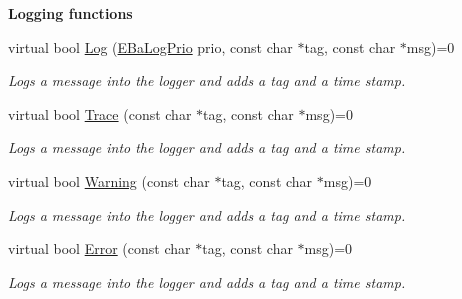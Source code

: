 \begin{Indent}\textbf{ Logging functions}\par
\begin{DoxyCompactItemize}
\item 
virtual bool \hyperlink{classIBaLog_aa5af90c31d02caaf2ce598eb71f774ad}{Log} (\hyperlink{BaLog_8h_ab14f00a81932b8b62d2e8c4a2d7e3916}{E\+Ba\+Log\+Prio} prio, const char $\ast$tag, const char $\ast$msg)=0
\begin{DoxyCompactList}\small\item\em Logs a message into the logger and adds a {\ttfamily tag} and a time stamp. \end{DoxyCompactList}\item 
virtual bool \hyperlink{classIBaLog_a3daf158cda6813367b7324ef5171291b}{Trace} (const char $\ast$tag, const char $\ast$msg)=0
\begin{DoxyCompactList}\small\item\em Logs a message into the logger and adds a {\ttfamily tag} and a time stamp. \end{DoxyCompactList}\item 
virtual bool \hyperlink{classIBaLog_a47861c723ea82ba833d71a698a972bd0}{Warning} (const char $\ast$tag, const char $\ast$msg)=0
\begin{DoxyCompactList}\small\item\em Logs a message into the logger and adds a {\ttfamily tag} and a time stamp. \end{DoxyCompactList}\item 
virtual bool \hyperlink{classIBaLog_a58b60a1b38183c0eea84677cb0ab5853}{Error} (const char $\ast$tag, const char $\ast$msg)=0
\begin{DoxyCompactList}\small\item\em Logs a message into the logger and adds a {\ttfamily tag} and a time stamp. \end{DoxyCompactList}\end{DoxyCompactItemize}
\end{Indent}
